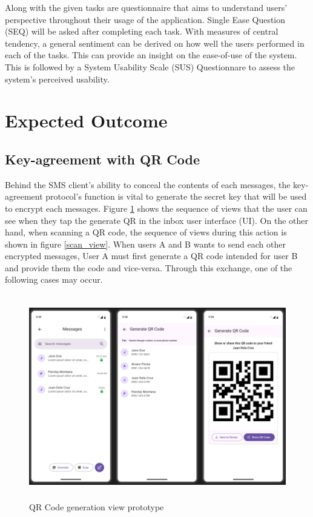 \documentclass[journal]{./IEEE/IEEEtran}
\begin{document}
Along with the given tasks are questionnaire that aims to understand users'
perspective throughout their usage of the application. Single Ease Question
(SEQ) will be asked after completing each task. With measures of central
tendency, a general sentiment can be derived on how well the users performed
in each of the tasks. This can provide an insight on the ease-of-use of the
system. This is followed by a System Usability Scale (SUS) Questionnare
to assess the system's perceived usability.

\section{Expected Outcome}
\subsection{Key-agreement with QR Code}
Behind the SMS client's ability to conceal the contents of each messages, the
key-agreement protocol's function is vital to generate the secret key that
will be used to encrypt each messages. Figure \ref{generate_view} shows the
sequence of views that the user can see when they tap the generate QR in the
inbox user interface (UI). On the other hand, when scanning a QR code,
the sequence of views during this action is shown in figure \ref{scan_view}.
When users A and B wants to send each other encrypted messages, User A must
first generate a QR code intended for user B and provide them the code and
vice-versa. Through this exchange, one of the following cases may occur.

\begin{figure}
	\centering
	\includegraphics[height=3.5in]{./images/Generate_QR_prototype.png}
	\caption{QR Code generation view prototype}
	\label{generate_view}
\end{figure}
\end{document}
